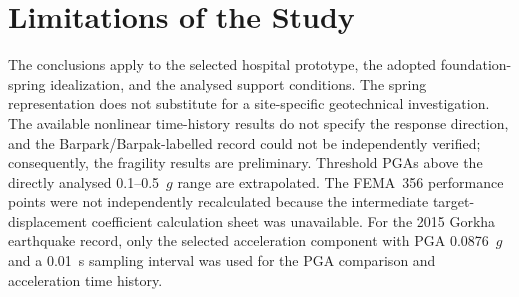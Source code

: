 \section{Limitations of the Study}
The conclusions apply to the selected hospital prototype, the adopted foundation-spring idealization, and the analysed support conditions. The spring representation does not substitute for a site-specific geotechnical investigation. The available nonlinear time-history results do not specify the response direction, and the Barpark/Barpak-labelled record could not be independently verified; consequently, the fragility results are preliminary. Threshold PGAs above the directly analysed 0.1--0.5~$g$ range are extrapolated. The FEMA~356 performance points were not independently recalculated because the intermediate target-displacement coefficient calculation sheet was unavailable. For the 2015 Gorkha earthquake record, only the selected acceleration component with PGA 0.0876~$g$ and a 0.01~s sampling interval was used for the PGA comparison and acceleration time history.
